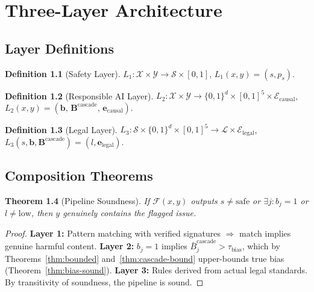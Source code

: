 \documentclass[12pt,a4paper]{report}
\theoremstyle{plain}
\newtheorem{theorem}{Theorem}[chapter]
\theoremstyle{definition}
\newtheorem{definition}[theorem]{Definition}
\theoremstyle{remark}
\newcommand{\framework}{\mathcal{F}}
\newcommand{\inputspace}{\mathcal{X}}
\newcommand{\outputspace}{\mathcal{Y}}
\newcommand{\safetylabels}{\mathcal{S}}
\newcommand{\legalrisk}{\mathcal{L}}
\newcommand{\evidence}{\mathcal{E}}
\newcommand{\biasvec}{\mathbf{B}}
\newcommand{\casc}{^{\text{cascade}}}
\newcommand{\taubias}{\tau_{\text{bias}}}
\begin{document}
\chapter{Three-Layer Architecture}
\label{ch:layers}

\section{Layer Definitions}

\begin{definition}[Safety Layer]
$L_1: \inputspace \times \outputspace
\to \safetylabels \times [0,1]$,\quad
$L_1(x,y) = (s, p_s)$.
\end{definition}

\begin{definition}[Responsible AI Layer]
$L_2: \inputspace \times \outputspace
\to \{0,1\}^d \times [0,1]^5 \times \evidence_{\text{causal}}$,\quad
$L_2(x,y) = (\mathbf{b},\, \biasvec\casc,\, \mathbf{e}_{\text{causal}})$.
\end{definition}

\begin{definition}[Legal Layer]
$L_3: \safetylabels \times \{0,1\}^d \times [0,1]^5
\to \legalrisk \times \evidence_{\text{legal}}$,\quad
$L_3(s,\mathbf{b},\biasvec\casc) = (l, \mathbf{e}_{\text{legal}})$.
\end{definition}

\section{Composition Theorems}

\begin{theorem}[Pipeline Soundness]
\label{thm:pipeline-sound}
If $\framework(x,y)$ outputs $s \neq \text{safe}$
or $\exists j: b_j = 1$ or $l \neq \text{low}$,
then $y$ genuinely contains the flagged issue.
\end{theorem}
\begin{proof}
\textbf{Layer 1:} Pattern matching with verified signatures
$\Rightarrow$ match implies genuine harmful content.
\textbf{Layer 2:} $b_j=1$ implies $\bar{B}_j\casc > \taubias$,
which by Theorems~\ref{thm:bounded} and~\ref{thm:cascade-bound}
upper-bounds true bias (Theorem~\ref{thm:bias-sound}).
\textbf{Layer 3:} Rules derived from actual legal standards.
By transitivity of soundness, the pipeline is sound.
\end{proof}
\end{document}
